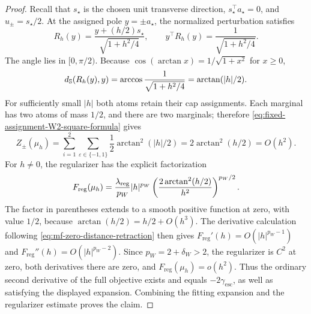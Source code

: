 \begin{proof}
Recall that \(s_\star\) is the chosen unit transverse direction,
\(s_\star^\top a_\star=0\), and \(u_\pm=s_\star/2\). At the assigned
pole \(y=\pm a_\star\), the normalized perturbation satisfies
\[
 R_h(y)=\frac{y+(h/2)s_\star}{\sqrt{1+h^2/4}},\qquad
 y^\top R_h(y)=\frac1{\sqrt{1+h^2/4}}.
\]
The angle lies in \([0,\pi/2)\). Because
\(\cos(\arctan x)=1/\sqrt{1+x^2}\) for \(x\ge0\),
\[
 d_{\mathbb{S}}(R_h(y),y)
 =\arccos\frac1{\sqrt{1+h^2/4}}=\arctan(|h|/2).
\]
For sufficiently small \(|h|\) both atoms retain their cap assignments.
Each marginal has two atoms of mass \(1/2\), and there are two marginals;
therefore \cref{eq:fixed-assignment-W2-square-formula} gives
\begin{equation}
\label{eq:mf-visible-path-metric-distance}
 Z_\pm(\mu_h)
 =\sum_{i=1}^2\sum_{\varepsilon\in\{-1,1\}}\frac12\arctan^2(|h|/2)
 =2\arctan^2(h/2)=O(h^2).
\end{equation}
For \(h\ne0\), the regularizer has the explicit factorization
\[
 F_{\mathrm{reg}}(\mu_h)=\frac{\lambda_{\mathrm{reg}}}{p_W}|h|^{p_W}
      \left(\frac{2\arctan^2(h/2)}{h^2}\right)^{p_W/2}.
\]
The factor in parentheses extends to a smooth positive function at zero,
with value \(1/2\), because \(\arctan(h/2)=h/2+O(h^3)\).
The derivative calculation following \cref{eq:mf-zero-distance-retraction}
then gives \(F_{\mathrm{reg}}'(h)=O(|h|^{p_W-1})\) and
\(F_{\mathrm{reg}}''(h)=O(|h|^{p_W-2})\).
Since \(p_W=2+\delta_W>2\), the regularizer is \(C^2\) at zero, both
derivatives there are zero, and \(F_{\mathrm{reg}}(\mu_h)=o(h^2)\).
Thus the ordinary second derivative of the full objective exists and equals
\(-2\gamma_{\mathrm{esc}}\), as well as satisfying the displayed expansion.
Combining the fitting expansion and the regularizer estimate proves the claim.
\end{proof}
